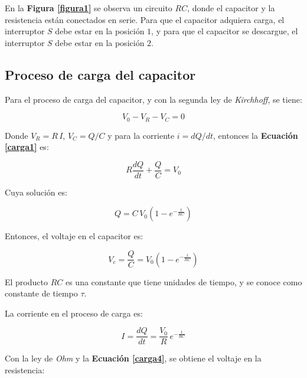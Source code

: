 \documentclass[letter,11pt]{article}
\begin{document}
En la \textbf{Figura \ref{figura1}} se observa un circuito $RC$, donde el
capacitor y la resistencia están conectados en serie. Para que el capacitor
adquiera carga, el interruptor $S$ debe estar en la posición $1$, y para que el
capacitor se descargue, el interruptor $S$ debe estar en la posición $2$.

\subsection{Proceso de carga del capacitor}
Para el proceso de carga del capacitor, y con la segunda ley de
\emph{Kirchhoff}, se tiene:

\begin{equation}
    V_0 - V_R - V_C = 0
\label{carga1}
\end{equation}
\vspace{-0.1cm}

Donde $V_R = R\,I$, $V_C = Q/C$ y para la corriente $i = dQ/dt$, entonces la
\textbf{Ecuación \ref{carga1}} es:

\begin{equation}
    R \frac{dQ}{dt} + \frac{Q}{C} = V_0
\label{carga2}
\end{equation}
\vspace{-0.1cm}

Cuya solución es:

\begin{equation*}
    Q = C\,V_0 (1 - e^{-\frac{t}{RC}})
\end{equation*}
\vspace{-0.1cm}

Entonces, el voltaje en el capacitor es:

\begin{equation}
    V_c = \frac{Q}{C} = V_0 (1 - e^{-\frac{t}{RC}})
\label{carga3}
\end{equation}
\vspace{-0.1cm}

El producto $RC$ es una constante que tiene unidades de tiempo, y se conoce como
constante de tiempo $\tau$.

La corriente en el proceso de carga es:

\begin{equation}
    I = \frac{dQ}{dt} = \frac{V_0}{R}\,e^{-\frac{t}{RC}}
\label{carga4}
\end{equation}
\vspace{-0.1cm}

Con la ley de \emph{Ohm} y la \textbf{Ecuación \ref{carga4}}, se obtiene el
voltaje en la resistencia:
\end{document}
